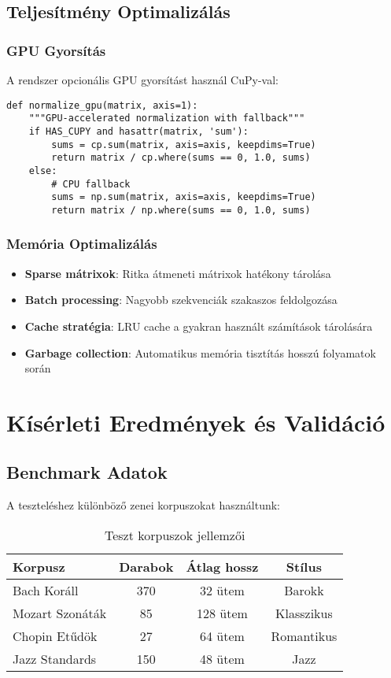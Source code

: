 \subsection{Teljesítmény Optimalizálás}

\subsubsection{GPU Gyorsítás}

A rendszer opcionális GPU gyorsítást használ CuPy-val:

\begin{verbatim}
def normalize_gpu(matrix, axis=1):
    """GPU-accelerated normalization with fallback"""
    if HAS_CUPY and hasattr(matrix, 'sum'):
        sums = cp.sum(matrix, axis=axis, keepdims=True)
        return matrix / cp.where(sums == 0, 1.0, sums)
    else:
        # CPU fallback
        sums = np.sum(matrix, axis=axis, keepdims=True)
        return matrix / np.where(sums == 0, 1.0, sums)
\end{verbatim}

\subsubsection{Memória Optimalizálás}

\begin{itemize}
    \item \textbf{Sparse mátrixok}: Ritka átmeneti mátrixok hatékony tárolása
    \item \textbf{Batch processing}: Nagyobb szekvenciák szakaszos feldolgozása
    \item \textbf{Cache stratégia}: LRU cache a gyakran használt számítások tárolására
    \item \textbf{Garbage collection}: Automatikus memória tisztítás hosszú folyamatok során
\end{itemize}

\section{Kísérleti Eredmények és Validáció}

\subsection{Benchmark Adatok}

A teszteléshez különböző zenei korpuszokat használtunk:

\begin{table}[h]
\centering
\begin{tabular}{|l|c|c|c|}
\hline
\textbf{Korpusz} & \textbf{Darabok} & \textbf{Átlag hossz} & \textbf{Stílus} \\
\hline
Bach Koráll & 370 & 32 ütem & Barokk \\
Mozart Szonáták & 85 & 128 ütem & Klasszikus \\
Chopin Etűdök & 27 & 64 ütem & Romantikus \\
Jazz Standards & 150 & 48 ütem & Jazz \\
\hline
\end{tabular}
\caption{Teszt korpuszok jellemzői}
\end{table}

